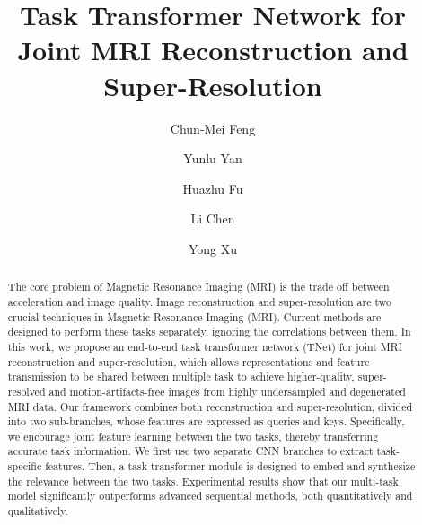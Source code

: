 \documentclass[runningheads]{llncs}
\begin{document}
\title{Task Transformer Network for Joint MRI Reconstruction and Super-Resolution}  
\author{Chun-Mei Feng
\and
Yunlu Yan
\and
Huazhu Fu
\and
Li Chen
\and
Yong Xu }

\maketitle              \begin{abstract}
The core problem of Magnetic Resonance Imaging (MRI) is the trade off between acceleration and image quality. Image reconstruction and super-resolution are two crucial techniques in Magnetic Resonance Imaging (MRI). Current methods are designed to perform these tasks separately, ignoring the correlations between them. In this work, we propose an end-to-end task transformer network (TNet) for joint MRI reconstruction and super-resolution, which allows representations and feature transmission to be shared between multiple task to achieve higher-quality, super-resolved and motion-artifacts-free images from highly undersampled and degenerated MRI data. Our framework combines both reconstruction and super-resolution, divided into two sub-branches, whose features are expressed as queries and keys. Specifically, we encourage joint feature learning between the two tasks, thereby transferring accurate task information. We first use two separate CNN branches to extract task-specific features. Then, a task transformer module is designed to embed and synthesize the relevance between the two tasks. Experimental results show that our multi-task model significantly outperforms advanced sequential methods, both quantitatively and qualitatively. 




\end{abstract}
\end{document}
